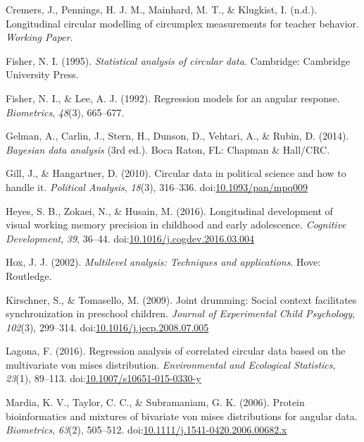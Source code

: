 \documentclass[11pt,]{article}
\begin{document}
\leavevmode\hypertarget{ref-longitudinalpaper}{}%
Cremers, J., Pennings, H. J. M., Mainhard, M. T., \& Klugkist, I.
(n.d.). Longitudinal circular modelling of circumplex measurements for
teacher behavior. \emph{Working Paper}.

\leavevmode\hypertarget{ref-fisher1995statistical}{}%
Fisher, N. I. (1995). \emph{Statistical analysis of circular data}.
Cambridge: Cambridge University Press.

\leavevmode\hypertarget{ref-fisher1992regression}{}%
Fisher, N. I., \& Lee, A. J. (1992). Regression models for an angular
response. \emph{Biometrics}, \emph{48}(3), 665--677.

\leavevmode\hypertarget{ref-BDA}{}%
Gelman, A., Carlin, J., Stern, H., Dunson, D., Vehtari, A., \& Rubin, D.
(2014). \emph{Bayesian data analysis} (3rd ed.). Boca Raton, FL: Chapman
\& Hall/CRC.

\leavevmode\hypertarget{ref-gill2010}{}%
Gill, J., \& Hangartner, D. (2010). Circular data in political science
and how to handle it. \emph{Political Analysis}, \emph{18}(3), 316--336.
doi:\href{https://doi.org/10.1093/pan/mpq009}{10.1093/pan/mpq009}

\leavevmode\hypertarget{ref-heyes2016longitudinal}{}%
Heyes, S. B., Zokaei, N., \& Husain, M. (2016). Longitudinal development
of visual working memory precision in childhood and early adolescence.
\emph{Cognitive Development}, \emph{39}, 36--44.
doi:\href{https://doi.org/10.1016/j.cogdev.2016.03.004}{10.1016/j.cogdev.2016.03.004}

\leavevmode\hypertarget{ref-hox2002multilevel}{}%
Hox, J. J. (2002). \emph{Multilevel analysis: Techniques and
applications}. Hove: Routledge.

\leavevmode\hypertarget{ref-kirschner2009joint}{}%
Kirschner, S., \& Tomasello, M. (2009). Joint drumming: Social context
facilitates synchronization in preschool children. \emph{Journal of
Experimental Child Psychology}, \emph{102}(3), 299--314.
doi:\href{https://doi.org/10.1016/j.jecp.2008.07.005}{10.1016/j.jecp.2008.07.005}

\leavevmode\hypertarget{ref-lagona2016regression}{}%
Lagona, F. (2016). Regression analysis of correlated circular data based
on the multivariate von mises distribution. \emph{Environmental and
Ecological Statistics}, \emph{23}(1), 89--113.
doi:\href{https://doi.org/10.1007/s10651-015-0330-y}{10.1007/s10651-015-0330-y}

\leavevmode\hypertarget{ref-mardia2007protein}{}%
Mardia, K. V., Taylor, C. C., \& Subramaniam, G. K. (2006). Protein
bioinformatics and mixtures of bivariate von mises distributions for
angular data. \emph{Biometrics}, \emph{63}(2), 505--512.
doi:\href{https://doi.org/10.1111/j.1541-0420.2006.00682.x}{10.1111/j.1541-0420.2006.00682.x}
\end{document}
